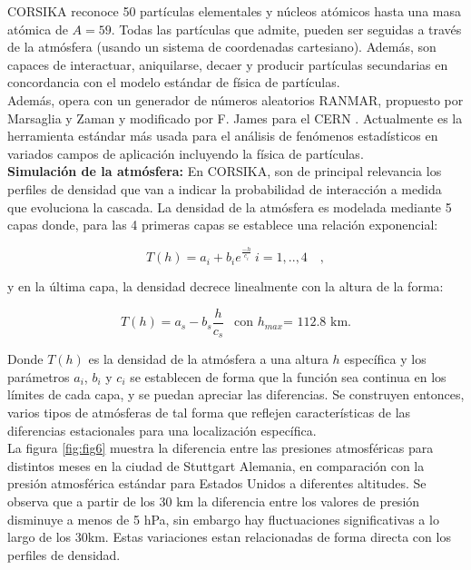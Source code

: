 CORSIKA reconoce 50 partículas elementales y núcleos atómicos hasta una masa atómica de $A = 59$. Todas las partículas que admite, pueden ser seguidas a través de la atmósfera (usando un sistema de coordenadas cartesiano). Además, son capaces de interactuar, aniquilarse, decaer y producir partículas secundarias en concordancia con el modelo estándar de física de partículas. \\

Además, opera con un generador de números aleatorios RANMAR, propuesto por Marsaglia y Zaman \parencite{RANMAR1} y modificado por F. James para el CERN \parencite{RANMAR2}. Actualmente es la herramienta estándar más usada para el análisis de fenómenos estadísticos en variados campos de aplicación incluyendo la física de partículas.\\

\textbf{Simulaci\'on de la atm\'osfera:} En CORSIKA, son de principal relevancia los perfiles de densidad que van a indicar la probabilidad de interacción a medida que evoluciona la cascada. La densidad de la atmósfera es modelada mediante 5 capas donde, para las 4 primeras capas se establece una relación exponencial:

\begin{equation}
T(h)=a_{i} + b_{i}e^{\frac{-h}{c_{i}}} \ i=1,..,4 \quad ,
\label{eq:eq25}
\end{equation}

y en la última capa, la densidad decrece linealmente con la altura de la forma:

\begin{equation}
T(h)=a_{s}-b_{s}\frac{h}{c_{s}} \ \ \mbox{ con $h_{max}$= 112.8 km} .
\label{eq:eq26}
\end{equation}


Donde $T(h)$ es la densidad de la atmósfera a una altura $h$ específica y los parámetros $a_{i}$, $b_{i}$ y $c_{i}$ se establecen de forma que la función sea continua en los límites de cada capa, y se puedan apreciar las diferencias. Se construyen entonces, varios tipos de atmósferas de tal forma que reflejen características de las diferencias estacionales \parencite{Heck1998} para una localización específica.\\

La figura \ref{fig:fig6} muestra la diferencia entre las presiones atmosféricas para distintos meses en la ciudad de Stuttgart Alemania, en comparación con la presión atmosférica estándar para Estados Unidos a diferentes altitudes. Se observa que a partir de los 30 km la diferencia entre los valores de presión disminuye a menos de 5 hPa, sin embargo hay fluctuaciones significativas a lo largo de los 30km. Estas variaciones estan relacionadas de forma directa con los perfiles de densidad.\\

